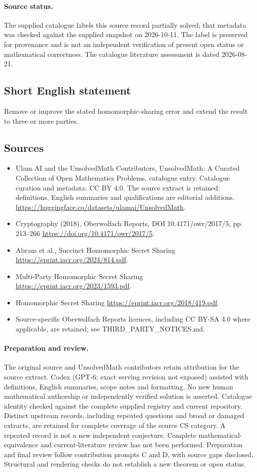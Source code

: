 \documentclass[11pt]{article}
\begin{document}
\paragraph{Source status.}
The supplied catalogue labels this source record partially solved; that metadata was checked against the supplied snapshot on 2026-10-11. The label is preserved for provenance and is not an independent verification of present open status or mathematical correctness. The catalogue literature assessment is dated 2026-08-21.
\subsection{Short English statement}
Remove or improve the stated homomorphic-sharing error and extend the result to three or more parties.
\subsection{Sources}
\begin{itemize}
\item[S1] Ulam AI and the UnsolvedMath Contributors, UnsolvedMath: A Curated Collection of Open Mathematics Problems, catalogue entry. Catalogue curation and metadata: CC BY 4.0. The source extract is retained; definitions, English summaries and qualifications are editorial additions.
\url{https://huggingface.co/datasets/ulamai/UnsolvedMath}.
\item[S2] Cryptography (2018), Oberwolfach Reports, DOI 10.4171/owr/2017/5, pp. 213--266
\url{https://doi.org/10.4171/owr/2017/5}.
\item[S3] Abram et al., Succinct Homomorphic Secret Sharing
\url{https://eprint.iacr.org/2024/814.pdf}.
\item[S4] Multi-Party Homomorphic Secret Sharing
\url{https://eprint.iacr.org/2023/1593.pdf}.
\item[S5] Homomorphic Secret Sharing
\url{https://eprint.iacr.org/2018/419.pdf}.
\item Source-specific Oberwolfach Reports licences, including CC BY-SA 4.0 where applicable, are retained; see THIRD\_PARTY\_NOTICES.md.
\end{itemize}
\paragraph{Preparation and review.}
The original source and UnsolvedMath contributors retain attribution for the source extract. Codex (GPT-6; exact serving revision not exposed) assisted with definitions, English summaries, scope notes and formatting. No new human mathematical authorship or independently verified solution is asserted. Catalogue identity checked against the complete supplied registry and current repository. Distinct upstream records, including repeated questions and broad or damaged extracts, are retained for complete coverage of the source CS category. A repeated record is not a new independent conjecture. Complete mathematical-equivalence and current-literature review has not been performed. Preparation and final review follow contribution prompts C and D, with source gaps disclosed. Structural and rendering checks do not establish a new theorem or open status.
\label{end:statement}
\end{document}
